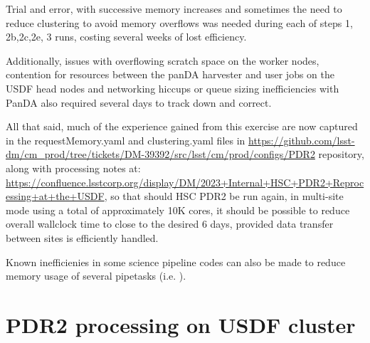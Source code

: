 Trial and error, with successive memory increases and sometimes the need to
reduce clustering to avoid memory overflows was needed during each of
steps 1, 2b,2c,2e, 3 runs, costing several weeks of lost efficiency.

Additionally, issues with overflowing scratch space on the worker nodes,
contention for resources between the panDA harvester and user jobs on the 
USDF head nodes and networking hiccups or queue sizing inefficiencies 
with PanDA also required several days to track down and correct.

All that said, much of the experience gained from this exercise are
now captured in the requestMemory.yaml and clustering.yaml files
in \url{https://github.com/lsst-dm/cm_prod/tree/tickets/DM-39392/src/lsst/cm/prod/configs/PDR2} repository, along with processing notes at:
\url{https://confluence.lsstcorp.org/display/DM/2023+Internal+HSC+PDR2+Reprocessing+at+the+USDF}, so that should HSC PDR2 be run again, in multi-site 
mode using a total of approximately 10K cores, it should be 
possible to reduce overall wallclock time to close to the desired 6 days,
provided data transfer between sites is efficiently handled.

Known inefficienies in some science pipeline codes can also be made to
reduce memory usage of several pipetasks (i.e. ).


\section{PDR2 processing on USDF cluster} \label{sec:processing}





